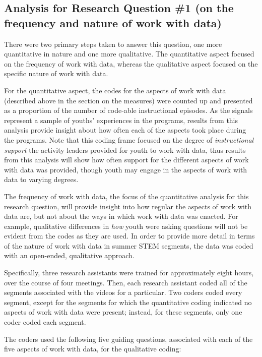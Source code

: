 \documentclass[]{msu-thesis}
\theoremstyle{definition}
\theoremstyle{definition}
\theoremstyle{definition}
\theoremstyle{remark}
\begin{document}
\subsection{Analysis for Research Question \#1 (on the frequency and
nature of work with
data)}\label{analysis-for-research-question-1-on-the-frequency-and-nature-of-work-with-data}

There were two primary steps taken to answer this question, one more
quantitative in nature and one more qualitative. The quantitative aspect
focused on the frequency of work with data, whereas the qualitative
aspect focused on the specific nature of work with data.

For the quantitative aspect, the codes for the aspects of work with data
(described above in the section on the measures) were counted up and
presented as a proportion of the number of code-able instructional
episodes. As the signals represent a sample of youths' experiences in
the programs, results from this analysis provide insight about how often
each of the aspects took place during the programs. Note that this
coding frame focused on the degree of \emph{instructional support} the
activity leaders provided for youth to work with data, thus results from
this analysis will show how often support for the different aspects of
work with data was provided, though youth may engage in the aspects of
work with data to varying degrees.

The frequency of work with data, the focus of the quantitative analysis
for this research question, will provide insight into how regular the
aspects of work with data are, but not about the ways in which work with
data was enacted. For example, qualitative differences in \emph{how}
youth were asking questions will not be evident from the codes as they
are used. In order to provide more detail in terms of the nature of work
with data in summer STEM segments, the data was coded with an
open-ended, qualitative approach.

Specifically, three research assistants were trained for approximately
eight hours, over the course of four meetings. Then, each research
assistant coded all of the segments associated with the videos for a
particular. Two coders coded every segment, except for the segments for
which the quantitative coding indicated no aspects of work with data
were present; instead, for these segments, only one coder coded each
segment.

The coders used the following five guiding questions, associated with
each of the five aspects of work with data, for the qualitative coding:
\end{document}
